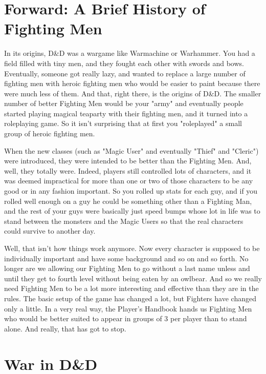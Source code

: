 \section{Forward: A Brief History of Fighting Men}

In its origins, D\&D was a wargame like Warmachine or Warhammer. You had a field filled with tiny men, and they fought each other with swords and bows. Eventually, someone got really lazy, and wanted to replace a large number of fighting men with heroic fighting men who would be easier to paint because there were much less of them. And that, right there, is the origins of D\&D. The smaller number of better Fighting Men would be your "army" and eventually people started playing magical teaparty with their fighting men, and it turned into a roleplaying game. So it isn't surprising that at first you "roleplayed" a small group of heroic fighting men.

When the new classes (such as "Magic User" and eventually "Thief" and "Cleric") were introduced, they were intended to be better than the Fighting Men. And, well, they totally were. Indeed, players still controlled lots of characters, and it was deemed impractical for more than one or two of those characters to be any good or in any fashion important. So you rolled up stats for each guy, and if you rolled well enough on a guy he could be something other than a Fighting Man, and the rest of your guys were basically just speed bumps whose lot in life was to stand between the monsters and the Magic Users so that the real characters could survive to another day.

Well, that isn't how things work anymore. Now every character is supposed to be individually important and have some background and so on and so forth. No longer are we allowing our Fighting Men to go without a last name unless and until they get to fourth level without being eaten by an owlbear. And so we really need Fighting Men to be a lot more interesting and effective than they are in the rules. The basic setup of the game has changed a lot, but Fighters have changed only a little. In a very real way, the Player's Handbook hands us Fighting Men who would be better suited to appear in groups of 3 per player than to stand alone. And really, that has got to stop.

\section{War in D\&D}
\vspace*{-10pt}

